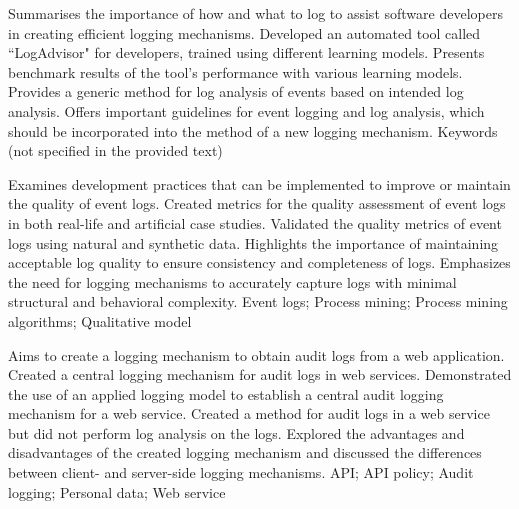 {
    Summarises the importance of how and what to log to assist software developers in creating efficient logging mechanisms.
}
{
    Developed an automated tool called “LogAdvisor" for developers, trained using different learning models.
}
{
    Presents benchmark results of the tool's performance with various learning models.
}
{
    Provides a generic method for log analysis of events based on intended log analysis. Offers important guidelines for event logging and log analysis, which should be incorporated into the method of a new logging mechanism.
}
{
    Keywords (not specified in the provided text)
}

{
    Examines development practices that can be implemented to improve or maintain the quality of event logs.
}
{
    Created metrics for the quality assessment of event logs in both real-life and artificial case studies.
}
{
    Validated the quality metrics of event logs using natural and synthetic data.
}
{
    Highlights the importance of maintaining acceptable log quality to ensure consistency and completeness of logs. Emphasizes the need for logging mechanisms to accurately capture logs with minimal structural and behavioral complexity.
}
{
    Event logs; Process mining; Process mining algorithms; Qualitative model
}

{
    Aims to create a logging mechanism to obtain audit logs from a web application.
}
{
    Created a central logging mechanism for audit logs in web services.
}
{
    Demonstrated the use of an applied logging model to establish a central audit logging mechanism for a web service.
}
{
    Created a method for audit logs in a web service but did not perform log analysis on the logs. Explored the advantages and disadvantages of the created logging mechanism and discussed the differences between client- and server-side logging mechanisms.
}
{
    API; API policy; Audit logging; Personal data; Web service
}

